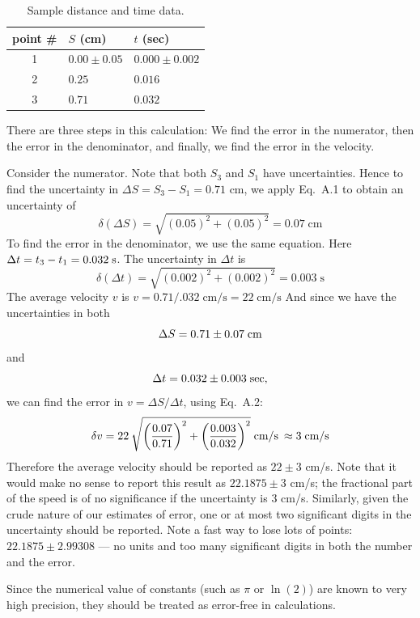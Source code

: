 \begin{table}[ht]
\begin{center}
\begin{tabular}{|cll|}
\hline
point \# & $S$ (cm) & $t$ (sec) \\ \hline
1 & $0.00 \pm 0.05$ & $0.000 \pm 0.002$ \\
2 & $0.25$ & $0.016$ \\
3 & $0.71$ & $0.032$
\\ \hline
\end{tabular}
\end{center}
\caption{Sample distance and time data.  \label{table2}}
\end{table}

There are three steps in this calculation:  We find the error in the
numerator, then the error in the denominator, and finally, we find
the error in the velocity.

Consider the numerator.  Note that both $S_3$ and $S_1$ have
uncertainties.  Hence to find the uncertainty in
$ \Delta S = S_{3} - S_{1} = 0.71$ cm, we apply Eq.~A.1 to obtain an
uncertainty of
\[
\delta (\Delta S) = \sqrt{ (0.05)^{2} + (0.05)^{2} } = 0.07 \;
\mbox{cm} \]
To find the error in the denominator, we use the same equation.
Here $\Delta t = t_{3} - t_{1} = 0.032 \; \rm{s}$.  The uncertainty
in $\Delta t$ is
\[
\delta (\Delta t) = \sqrt{ (0.002)^{2} + (0.002)^{2} } = 0.003 \;
\mbox{s}
\]
The average velocity $v$ is
$v = 0.71/.032 \; \mbox{cm/s} = 22 \; \mbox{cm/s}$
And since we have the uncertainties in both
\[
\Delta S = 0.71 \pm 0.07 \; \rm{cm}
\]
and
\[
 \Delta t = 0.032 \pm 0.003 \; \rm{sec},
\]
we can find the error in $v = \Delta S / \Delta t$, using Eq.~A.2:
\[
\delta v = 22 \: \sqrt{ \left({{0.07} \over {0.71}}\right)^{2} +
           \left({{0.003} \over {0.032}}\right)^{2} } \; \mbox{cm/s} \:
         \approx 3 \; \mbox{cm/s}
\]
 Therefore the average velocity should be reported as $22 \pm 3$ cm/s.
Note that it would make no sense to report this result as $ 22.1875\pm 3$ cm/s;
the fractional part of the speed is of no significance if the uncertainty  is 3 cm/s.
Similarly, given the crude nature of our estimates of error, one or at most
two significant digits in the uncertainty should be reported.  
Note a fast way to lose lots of points: $ 22.1875\pm 2.99308$ --- no units and 
too many significant digits in both the number and the error.

Since the numerical value of  constants (such as
$\pi$ or $\ln(2)$) are known to very high precision, they should
be treated as error-free in calculations.  


